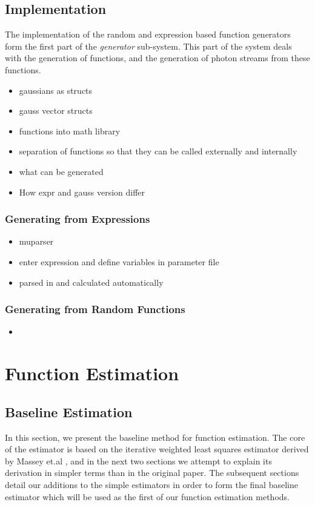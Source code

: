\documentclass[a4paper,11pt]{article}
\begin{document}
\subsection{Implementation}
\label{sec-4-3}

    The implementation of the random and expression based function generators
    form the first part of the \emph{generator} sub-system. This part of the
    system deals with the generation of functions, and the generation of photon
    streams from these functions.
\begin{itemize}
\item gaussians as structs
\item gauss vector structs
\item functions into math library
\item separation of functions so that they can be called externally and internally
\item what can be generated
\item How expr and gauss version differ
\end{itemize}
\subsubsection{Generating from Expressions}
\label{sec-4-3-1}

\begin{itemize}
\item muparser
\item enter expression and define variables in parameter file
\item parsed in and calculated automatically
\end{itemize}
\subsubsection{Generating from Random Functions}
\label{sec-4-3-2}

\begin{itemize}
\item 
\end{itemize}
\section{Function Estimation}
\label{sec-5}
\subsection{Baseline Estimation}
\label{sec-5-1}

In this section, we present the baseline method for function estimation. The
core of the estimator is based on the iterative weighted least squares estimator
derived by Massey et.al \cite{massey1996estimating}, and in the next two
sections we attempt to explain its derivation in simpler terms than in the
original paper. The subsequent sections detail our additions to the simple
estimators in order to form the final baseline estimator which will be used as
the first of our function estimation methods.
\end{document}
